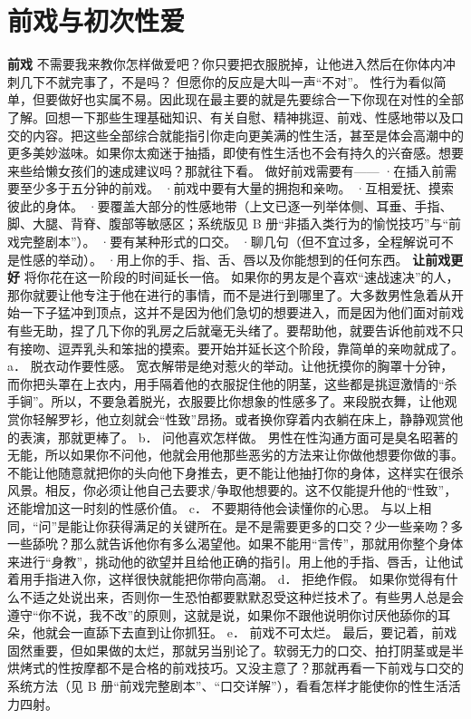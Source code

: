 \documentclass[12pt,UTF8,openany]{ctexbook}
\begin{document}
\section{前戏与初次性爱}
\textbf{前戏}
不需要我来教你怎样做爱吧？你只要把衣服脱掉，让他进入然后在你体内冲刺几下不就完事了，不是吗？
但愿你的反应是大叫一声“不对”。
性行为看似简单，但要做好也实属不易。因此现在最主要的就是先要综合一下你现在对性的全部了解。回想一下那些生理基础知识、有关自慰、精神挑逗、前戏、性感地带以及口交的内容。把这些全部综合就能指引你走向更美满的性生活，甚至是体会高潮中的更多美妙滋味。如果你太痴迷于抽插，即使有性生活也不会有持久的兴奋感。想要来些给懒女孩们的速成建议吗？那就往下看。
做好前戏需要有——
·在插入前需要至少多于五分钟的前戏。
·前戏中要有大量的拥抱和亲吻。
·互相爱抚、摸索彼此的身体。
·要覆盖大部分的性感地带（上文已逐一列举体侧、耳垂、手指、脚、大腿、背脊、腹部等敏感区；系统版见 B 册“非插入类行为的愉悦技巧”与“前戏完整剧本”）。
·要有某种形式的口交。
·聊几句（但不宜过多，全程解说可不是性感的举动）。
·用上你的手、指、舌、唇以及你能想到的任何东西。
\textbf{让前戏更好}
将你花在这一阶段的时间延长一倍。
如果你的男友是个喜欢“速战速决”的人，那你就要让他专注于他在进行的事情，而不是进行到哪里了。大多数男性急着从开始一下子猛冲到顶点，这并不是因为他们急切的想要进入，而是因为他们面对前戏有些无助，捏了几下你的乳房之后就毫无头绪了。要帮助他，就要告诉他前戏不只有接吻、逗弄乳头和笨拙的摸索。要开始并延长这个阶段，靠简单的亲吻就成了。
a． 脱衣动作要性感。
宽衣解带是绝对惹火的举动。让他抚摸你的胸罩十分钟，而你把头罩在上衣内，用手隔着他的衣服捉住他的阴茎，这些都是挑逗激情的“杀手锏”。所以，不要急着脱光，衣服要比你想象的性感多了。来段脱衣舞，让他观赏你轻解罗衫，他立刻就会“性致”昂扬。或者换你穿着内衣躺在床上，静静观赏他的表演，那就更棒了。
b． 问他喜欢怎样做。
男性在性沟通方面可是臭名昭著的无能，所以如果你不问他，他就会用他那些恶劣的方法来让你做他想要你做的事。不能让他随意就把你的头向他下身推去，更不能让他抽打你的身体，这样实在很杀风景。相反，你必须让他自己去要求/争取他想要的。这不仅能提升他的“性致”，还能增加这一时刻的性感价值。
c． 不要期待他会读懂你的心思。
与以上相同，“问”是能让你获得满足的关键所在。是不是需要更多的口交？少一些亲吻？多一些舔吮？那么就告诉他你有多么渴望他。如果不能用“言传”，那就用你整个身体来进行“身教”，挑动他的欲望并且给他正确的指引。用上他的手指、唇舌，让他试着用手指进入你，这样很快就能把你带向高潮。
d． 拒绝作假。
如果你觉得有什么不适之处说出来，否则你一生恐怕都要默默忍受这种烂技术了。有些男人总是会遵守“你不说，我不改”的原则，这就是说，如果你不跟他说明你讨厌他舔你的耳朵，他就会一直舔下去直到让你抓狂。
e． 前戏不可太烂。
最后，要记着，前戏固然重要，但如果做的太烂，那就另当别论了。软弱无力的口交、拍打阴茎或是半烘烤式的性按摩都不是合格的前戏技巧。又没主意了？那就再看一下前戏与口交的系统方法（见 B 册“前戏完整剧本”、“口交详解”），看看怎样才能使你的性生活活力四射。
\end{document}
